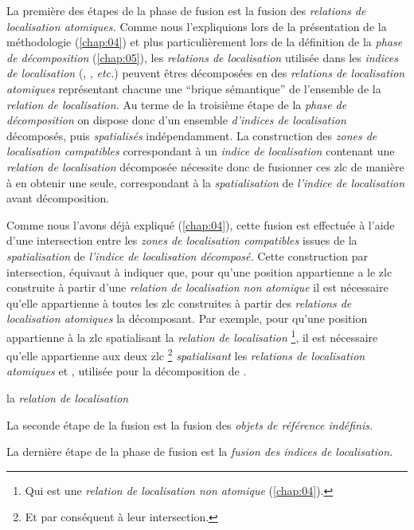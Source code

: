 La première des étapes de la phase de fusion est la fusion des
\emph{relations de localisation atomiques.} Comme nous l'expliquions
lors de la présentation de la méthodologie (\autoref{chap:04}) et plus
particulièrement lors de la définition de la \emph{phase de
  décomposition} (\autoref{chap:05}), les \emph{relations de
  localisation} utilisée dans les \emph{indices de localisation}
(, , \emph{etc.})
peuvent êtres décomposées en des \emph{relations de localisation
  atomiques} représentant chacune une \enquote{brique sémantique} de
l'ensemble de la \emph{relation de localisation.} Au terme de la
troisième étape de la \emph{phase de décomposition} on dispose donc
d'un ensemble \emph{d'indices de localisation} décomposés, puis
\emph{spatialisés} indépendamment. La construction des \emph{zones de
  localisation compatibles} correspondant à un \emph{indice de
  localisation} contenant une \emph{relation de localisation}
décomposée nécessite donc de fusionner ces \ac{zlc} de manière à en
obtenir une seule, correspondant à la \emph{spatialisation} de
\emph{l'indice de localisation} avant décomposition.

Comme nous l'avons déjà expliqué (\autoref{chap:04}), cette fusion est
effectuée à l'aide d'une intersection entre les \emph{zones de
  localisation compatibles} issues de la \emph{spatialisation} de
\emph{l'indice de localisation décomposé.} Cette construction par
intersection, équivaut à indiquer que, pour qu'une position
appartienne a le \ac{zlc} construite à partir d'une \emph{relation de
  localisation non atomique} il est nécessaire qu'elle appartienne à
toutes les \ac{zlc} construites à partir des \emph{relations de
  localisation atomiques} la décomposant. Par exemple, pour qu'une
position appartienne à la \ac{zlc} spatialisant la \emph{relation de
  localisation}  \footnote{Qui est une
  \emph{relation de localisation non atomique} (\autoref{chap:04}).},
il est nécessaire qu'elle appartienne aux deux \ac{zlc} \footnote{Et
  par conséquent à leur intersection.} \emph{spatialisant} les
\emph{relations de localisation atomiques} 
et , utilisée pour la décomposition de
.

la \emph{relation de localisation}

La seconde étape de la fusion est la fusion des \emph{objets de
  référence indéfinis.}

La dernière étape de la phase de fusion est la \emph{fusion des
  indices de localisation.}


